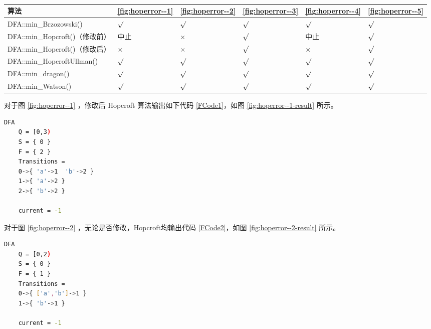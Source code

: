 \begin{table}[!htbp]
    \caption{  }
    \label{tab:KeepMinResultofAll}
    \centering
    \small%
    \setlength{\tabcolsep}{4pt}%
    \renewcommand{\arraystretch}{1.2}%
    \begin{tabular}{l|p{4em}<{\centering} p{4em}<{\centering} p{4em}<{\centering} p{4em}<{\centering} p{4em}<{\centering} }  %
        \toprule %
        算法 & \ref{fig:hoperror--1} & \ref{fig:hoperror--2} & \ref{fig:hoperror--3} & \ref{fig:hoperror--4} &  \ref{fig:hoperror--5}  \\
        \midrule
        DFA::min\_Brzozowski()        & $\surd$ & $\surd$ & $\surd$ & $\surd$     & $\surd$        \\
        DFA::min\_Hopcroft()（修改前） & 中止    & $\times$ & $\surd$ & 中止        & $\surd$       \\
        DFA::min\_Hopcroft()（修改后） & $\times$& $\times$& $\surd$ & $\times$    & $\surd$       \\
        DFA::min\_HopcroftUllman()    & $\surd$ & $\surd$ & $\surd$ & $\surd$     & $\surd$       \\
        DFA::min\_dragon()            & $\surd$ & $\surd$ & $\surd$ & $\surd$     & $\surd$       \\
        DFA::min\_Watson()            & $\surd$ & $\surd$ & $\surd$ & $\surd$     & $\surd$       \\
        \bottomrule%
    \end{tabular}
\end{table}

对于图 \ref{fig:hoperror--1} ，修改后 Hopcroft 算法输出如下代码 \ref{FCode1}，如图 \ref{fig:hoperror--1-result} 所示。

\begin{lstlisting}[language=bash,label={FCode1},caption={图 \ref{fig:hoperror--1} 输出}]
    DFA
    Q = [0,3)
    S = { 0 }
    F = { 2 }
    Transitions =
    0->{ 'a'->1  'b'->2 }
    1->{ 'a'->2 }
    2->{ 'b'->2 }

    current = -1
\end{lstlisting}
 
对于图 \ref{fig:hoperror--2} ，无论是否修改，Hopcroft均输出代码 \ref{FCode2}，如图 \ref{fig:hoperror--2-result} 所示。
\begin{lstlisting}[language=bash,label={FCode2},caption={图 \ref{fig:hoperror--2} 输出}]
    DFA
    Q = [0,2)
    S = { 0 }
    F = { 1 }
    Transitions =
    0->{ ['a','b']->1 }
    1->{ 'b'->1 }

    current = -1
\end{lstlisting}

